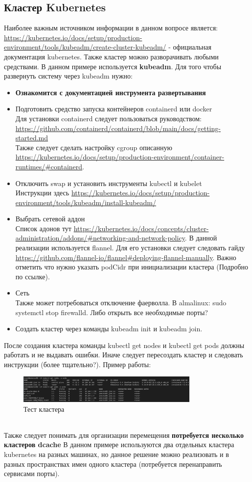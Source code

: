 \documentclass{article}
\begin{document}
\subsection{Кластер Kubernetes}
Наиболее важным источником информации в данном вопросе является: \url{https://kubernetes.io/docs/setup/production-environment/tools/kubeadm/create-cluster-kubeadm/} - официальная документация kubernetes. Также кластер можно разворачивать 
любыми средствами. В данном примере используется \textbf{kubeadm}.  Для того чтобы развернуть систему через kubeadm нужно:
\begin{itemize}
   \item \textbf{Ознакомится с документацией инструмента развертывания}
   \item Подготовить средство запуска контейнеров containerd или docker \\
   Для установки containerd следует пользоваться руководством: \url{https://github.com/containerd/containerd/blob/main/docs/getting-started.md}\\
   Также следует сделать настройку cgroup описанную \url{https://kubernetes.io/docs/setup/production-environment/container-runtimes/#containerd}.
   \item Отключить swap и установить инструменты kubectl и kubelet\\
   Инструкции здесь \url{https://kubernetes.io/docs/setup/production-environment/tools/kubeadm/install-kubeadm/}
   \item Выбрать сетевой аддон\\
   Список адонов тут \url{https://kubernetes.io/docs/concepts/cluster-administration/addons/#networking-and-network-policy}. В данной реализации используется 
   flannel. Для его установки следует следовать гайду \url{https://github.com/flannel-io/flannel#deploying-flannel-manually}. Важно отметить что нужно указать podCidr при инициализации 
   кластера (Подробно по ссылке).
   \item Сеть\\
   Также может потребоваться отключение фаерволла. В almalinux: sudo systemctl stop firewalld. Либо открыть все необходимые порты?
   \item Создать кластер через команды kubeadm init и kubeadm join.
\end{itemize}
После создания кластера команды kubectl get nodes и kubectl get pods должны работать и не выдавать ошибки. Иначе следует пересоздать кластер и следовать инструкции (более тщательно?).
Пример работы:
\begin{figure}[h]
   \centering
   \includegraphics[width=0.8\textwidth]{images/examp.png}
   \caption{Тест кластера}
\end{figure}\\
Также следует понимать для организации перемещения \textbf{потребуется несколько кластеров dcache} В данном примере используются два отдельных кластера kubernetes на разных машинах, но данное решение можно реализовать и в разных пространствах имен одного кластера (потребуется перенаправить сервисами порты).
\end{document}
